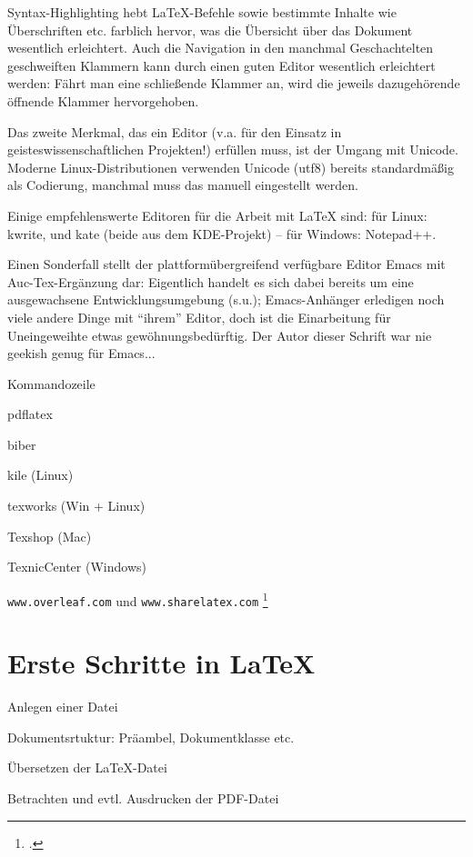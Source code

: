 \documentclass[%
   fontsize=11pt,%
   paper=17cm:24cm,%
   DIV=13,%
   pagesize%
   ]{scrbook}  	%
\begin{document}
Syntax-Highlighting hebt \LaTeX-Befehle sowie bestimmte Inhalte wie Überschriften etc. farblich
hervor, was die Übersicht über das Dokument wesentlich erleichtert. Auch die Navigation in
den manchmal Geschachtelten geschweiften Klammern kann durch einen guten Editor wesentlich
erleichtert werden: Fährt man eine schließende Klammer an, wird die jeweils dazugehörende
öffnende Klammer hervorgehoben.

Das zweite Merkmal, das ein Editor (v.a. für den Einsatz in geisteswissenschaftlichen Projekten!) 
erfüllen muss, ist der Umgang mit Unicode. Moderne Linux-Distributionen verwenden Unicode (utf8)
bereits standardmäßig als Codierung, manchmal muss das manuell eingestellt werden.

Einige empfehlenswerte Editoren für die Arbeit mit \LaTeX{} sind:
für Linux: kwrite,  und kate (beide aus dem KDE-Projekt) --
für Windows: Notepad++.

Einen Sonderfall stellt der plattformübergreifend verfügbare Editor Emacs mit Auc-Tex-Ergänzung
dar: Eigentlich handelt es sich dabei bereits um eine ausgewachsene Entwicklungsumgebung (s.u.);
Emacs-Anhänger erledigen noch viele andere Dinge mit \enquote{ihrem} Editor, doch ist die 
Einarbeitung für Uneingeweihte etwas gewöhnungsbedürftig.
Der Autor dieser Schrift war nie geekish genug für Emacs...

Kommandozeile

pdflatex

biber



kile (Linux)

texworks (Win + Linux)

Texshop (Mac)

TexnicCenter (Windows)


\texttt{www.overleaf.com}  und \texttt{www.sharelatex.com} 
\footcite{meyer:dtk2015/1}



\section{Erste Schritte in \LaTeX}

Anlegen einer Datei

Dokumentsrtuktur: Präambel, Dokumentklasse etc.

Übersetzen der \LaTeX{}-Datei

Betrachten und evtl. Ausdrucken der PDF-Datei
\end{document}
